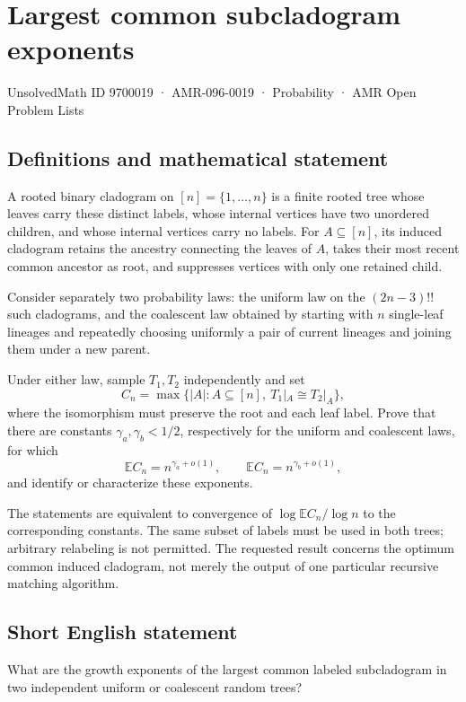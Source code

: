 \documentclass[11pt,a4paper]{article}
\begin{document}
\section*{Largest common subcladogram exponents}\label{9700019}
{\small UnsolvedMath ID 9700019 · AMR-096-0019 · Probability · AMR Open Problem Lists}
\subsection{Definitions and mathematical statement}
A rooted binary cladogram on $[n]=\{1,\ldots,n\}$ is a finite rooted tree whose leaves carry these distinct labels, whose internal vertices have two unordered children, and whose internal vertices carry no labels. For $A\subseteq[n]$, its induced cladogram retains the ancestry connecting the leaves of $A$, takes their most recent common ancestor as root, and suppresses vertices with only one retained child.

Consider separately two probability laws: the uniform law on the $(2n-3)!!$ such cladograms, and the coalescent law obtained by starting with $n$ single-leaf lineages and repeatedly choosing uniformly a pair of current lineages and joining them under a new parent.

Under either law, sample $T_1,T_2$ independently and set
\[
C_n=\max\{|A|:A\subseteq[n],\ T_1|_A\cong T_2|_A\},
\]
where the isomorphism must preserve the root and each leaf label. Prove that there are constants $\gamma_a,\gamma_b<1/2$, respectively for the uniform and coalescent laws, for which
\[
\mathbb EC_n=n^{\gamma_a+o(1)},\qquad
\mathbb EC_n=n^{\gamma_b+o(1)},
\]
and identify or characterize these exponents.

The statements are equivalent to convergence of $\log\mathbb EC_n/\log n$ to the corresponding constants. The same subset of labels must be used in both trees; arbitrary relabeling is not permitted. The requested result concerns the optimum common induced cladogram, not merely the output of one particular recursive matching algorithm.
\subsection{Short English statement}
What are the growth exponents of the largest common labeled subcladogram in two independent uniform or coalescent random trees?
\end{document}
